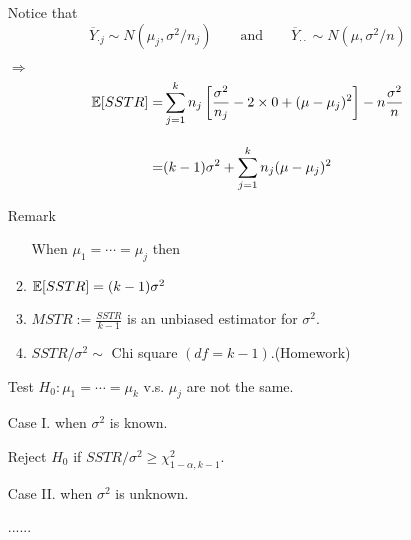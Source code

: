\begin{frame}[fragile]

\begin{enumerate}
	\item[] Notice that \\[1em]
		\[
			\overline{Y}_{\cdot j}\sim N(\mu_j,\sigma^2/n_j)\qquad\text{and}\qquad
			\overline{Y}_{\cdot \cdot}\sim N(\mu,\sigma^2/n)
		\]
		\vfill
	\item[$\Longrightarrow$]
		\begin{align*}
			\mathbb{E}[SSTR]  =& \sum_{j=1}^k n_j \left[\frac{\sigma^2}{n_j} -2\times 0 + (\mu-\mu_j)^2\right]- n \frac{\sigma^2}{n}\\[1em]
			=& (k-1)\sigma^2 + \sum_{j=1}^k n_j (\mu-\mu_j)^2
		\end{align*}
		\vfill
	\item[Remark]
		\begin{enumerate}
			\item[] When $\mu_1=\cdots=\mu_j$ then \\[1em]
			\item $\mathbb{E}[SSTR]=(k-1)\sigma^2$  \\[1em]
			\item $MSTR:=\frac{SSTR}{k-1}$
				is an unbiased estimator for $\sigma^2$.\\[1em]
			\item $SSTR/\sigma^2 \sim$ Chi square $(df=k-1)$.\hfill (Homework)
		\end{enumerate}
\end{enumerate}
\end{frame}
\begin{frame}[fragile]

	\begin{enumerate}
		\item[] Test $H_0:\mu_1=\cdots=\mu_k$ v.s. $\mu_j$ are not the same.
			\vfill
		\item[Case I.] when $\sigma^2$ is known.\\[2em]
		\item[] Reject $H_0$ if $SSTR/\sigma^2\ge \chi^2_{1-\alpha,k-1}$.
			\vfill
		\item[Case II.] when $\sigma^2$ is unknown.\\[2em]
		\item[] ......
	\end{enumerate}
\end{frame}

